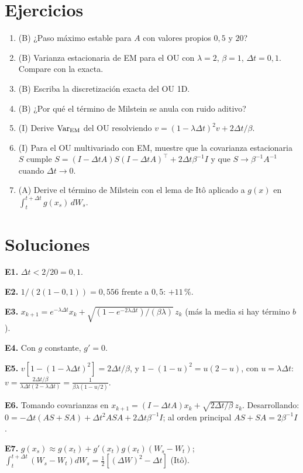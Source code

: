 \documentclass[11pt,a4paper]{article}
\begin{document}

\section{Ejercicios}
\begin{enumerate}[label=\textbf{E\arabic*.}]
\item (B) ¿Paso máximo estable para $A$ con valores propios $0{,}5$ y $20$?
\item (B) Varianza estacionaria de EM para el OU con $\lambda=2$, $\beta=1$, $\Delta t=0{,}1$. Compare con la exacta.
\item (B) Escriba la discretización exacta del OU 1D.
\item (B) ¿Por qué el término de Milstein se anula con ruido aditivo?
\item (I) Derive $\operatorname{Var}_{\text{EM}}$ del OU resolviendo $v=(1-\lambda\Delta t)^2v+2\Delta t/\beta$.
\item (I) Para el OU multivariado con EM, muestre que la covarianza estacionaria $S$ cumple $S=(I-\Delta tA)S(I-\Delta tA)^\top+2\Delta t\beta^{-1}I$ y que $S\to\beta^{-1}A^{-1}$ cuando $\Delta t\to0$.
\item (A) Derive el término de Milstein con el lema de Itô aplicado a $g(x)$ en $\int_t^{t+\Delta t}g(x_s)\,dW_s$.
\end{enumerate}

\section{Soluciones}
\begin{solucion}
\textbf{E1.} $\Delta t<2/20=0{,}1$.

\textbf{E2.} $1/(2(1-0{,}1))=0{,}556$ frente a $0{,}5$: $+11\,\%$.

\textbf{E3.} $x_{k+1}=e^{-\lambda\Delta t}x_k+\sqrt{(1-e^{-2\lambda\Delta t})/(\beta\lambda)}\,z_k$ (más la media si hay término $b$).

\textbf{E4.} Con $g$ constante, $g'=0$.

\textbf{E5.} $v[1-(1-\lambda\Delta t)^2]=2\Delta t/\beta$, y $1-(1-u)^2=u(2-u)$, con $u=\lambda\Delta t$: $v=\frac{2\Delta t/\beta}{\lambda\Delta t(2-\lambda\Delta t)}=\frac{1}{\beta\lambda(1-u/2)}$.

\textbf{E6.} Tomando covarianzas en $x_{k+1}=(I-\Delta tA)x_k+\sqrt{2\Delta t/\beta}\,z_k$. Desarrollando: $0=-\Delta t(AS+SA)+\Delta t^2ASA+2\Delta t\beta^{-1}I$; al orden principal $AS+SA=2\beta^{-1}I$.

\textbf{E7.} $g(x_s)\approx g(x_t)+g'(x_t)g(x_t)(W_s-W_t)$; $\int_t^{t+\Delta t}(W_s-W_t)dW_s=\frac12[(\Delta W)^2-\Delta t]$ (Itô).
\end{solucion}
\end{document}
